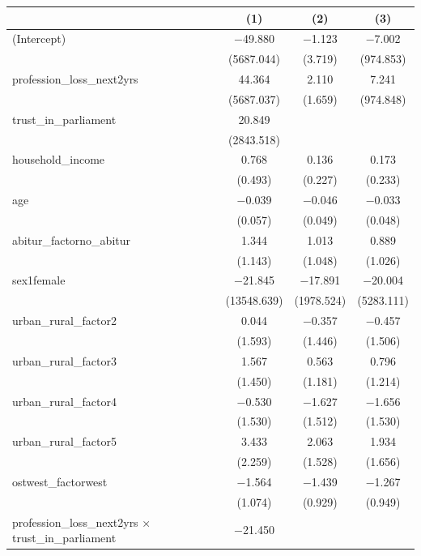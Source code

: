 \documentclass[
]{article}
\begin{document}
\begin{table}
\centering
\begin{tabular}[t]{lccc}
\toprule
  & (1) & (2) & (3)\\
\midrule
(Intercept) & \num{-49.880} & \num{-1.123} & \num{-7.002}\\
 & (\num{5687.044}) & (\num{3.719}) & (\num{974.853})\\
profession\_loss\_next2yrs & \num{44.364} & \num{2.110} & \num{7.241}\\
 & (\num{5687.037}) & (\num{1.659}) & (\num{974.848})\\
trust\_in\_parliament & \num{20.849} &  & \\
 & (\num{2843.518}) &  \vphantom{1} & \\
household\_income & \num{0.768} & \num{0.136} & \num{0.173}\\
 & (\num{0.493}) & (\num{0.227}) & (\num{0.233})\\
age & \num{-0.039} & \num{-0.046} & \num{-0.033}\\
 & (\num{0.057}) & (\num{0.049}) & (\num{0.048})\\
abitur\_factorno\_abitur & \num{1.344} & \num{1.013} & \num{0.889}\\
 & (\num{1.143}) & (\num{1.048}) & (\num{1.026})\\
sex1female & \num{-21.845} & \num{-17.891} & \num{-20.004}\\
 & (\num{13548.639}) & (\num{1978.524}) & (\num{5283.111})\\
urban\_rural\_factor2 & \num{0.044} & \num{-0.357} & \num{-0.457}\\
 & (\num{1.593}) & (\num{1.446}) & (\num{1.506})\\
urban\_rural\_factor3 & \num{1.567} & \num{0.563} & \num{0.796}\\
 & (\num{1.450}) & (\num{1.181}) & (\num{1.214})\\
urban\_rural\_factor4 & \num{-0.530} & \num{-1.627} & \num{-1.656}\\
 & (\num{1.530}) & (\num{1.512}) & (\num{1.530})\\
urban\_rural\_factor5 & \num{3.433} & \num{2.063} & \num{1.934}\\
 & (\num{2.259}) & (\num{1.528}) & (\num{1.656})\\
ostwest\_factorwest & \num{-1.564} & \num{-1.439} & \num{-1.267}\\
 & (\num{1.074}) & (\num{0.929}) & (\num{0.949})\\
profession\_loss\_next2yrs × trust\_in\_parliament & \num{-21.450} &  & \\

\end{tabular}
\end{table}
\end{document}
